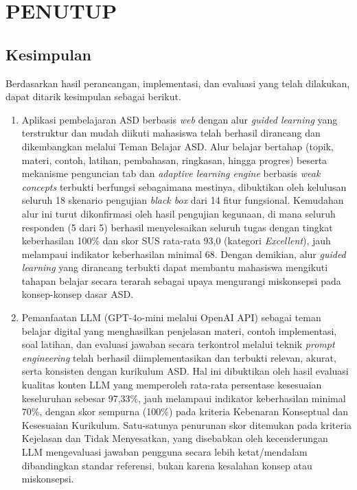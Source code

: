\cleardoublepage
\chapter{PENUTUP}
\label{chap:penutup}

\section{Kesimpulan}

Berdasarkan hasil perancangan, implementasi, dan evaluasi yang telah dilakukan, dapat ditarik kesimpulan sebagai berikut.

\begin{enumerate}
    \item Aplikasi pembelajaran ASD berbasis \textit{web} dengan alur \textit{guided learning} yang terstruktur dan mudah diikuti mahasiswa telah berhasil dirancang dan dikembangkan melalui Teman Belajar ASD. Alur belajar bertahap (topik, materi, contoh, latihan, pembahasan, ringkasan, hingga progres) beserta mekanisme penguncian tab dan \textit{adaptive learning engine} berbasis \textit{weak concepts} terbukti berfungsi sebagaimana mestinya, dibuktikan oleh kelulusan seluruh 18 skenario pengujian \textit{black box} dari 14 fitur fungsional. Kemudahan alur ini turut dikonfirmasi oleh hasil pengujian kegunaan, di mana seluruh responden (5 dari 5) berhasil menyelesaikan seluruh tugas dengan tingkat keberhasilan 100\% dan skor SUS rata-rata 93,0 (kategori \textit{Excellent}), jauh melampaui indikator keberhasilan minimal 68. Dengan demikian, alur \textit{guided learning} yang dirancang terbukti dapat membantu mahasiswa mengikuti tahapan belajar secara terarah sebagai upaya mengurangi miskonsepsi pada konsep-konsep dasar ASD.

    \item Pemanfaatan LLM (GPT-4o-mini melalui OpenAI API) sebagai teman belajar digital yang menghasilkan penjelasan materi, contoh implementasi, soal latihan, dan evaluasi jawaban secara terkontrol melalui teknik \textit{prompt engineering} telah berhasil diimplementasikan dan terbukti relevan, akurat, serta konsisten dengan kurikulum ASD. Hal ini dibuktikan oleh hasil evaluasi kualitas konten LLM yang memperoleh rata-rata persentase kesesuaian keseluruhan sebesar 97,33\%, jauh melampaui indikator keberhasilan minimal 70\%, dengan skor sempurna (100\%) pada kriteria Kebenaran Konseptual dan Kesesuaian Kurikulum. Satu-satunya penurunan skor ditemukan pada kriteria Kejelasan dan Tidak Menyesatkan, yang disebabkan oleh kecenderungan LLM mengevaluasi jawaban pengguna secara lebih ketat/mendalam dibandingkan standar referensi, bukan karena kesalahan konsep atau miskonsepsi.
\end{enumerate}

